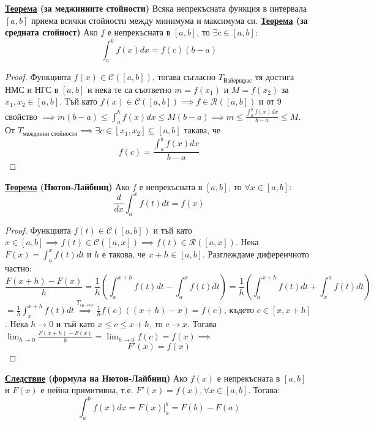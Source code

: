 \documentclass{article}
\begin{document}
\textbf{\underline{Теорема} (за меджинните стойности)} \newline
Всяка непрекъсната функция в интервала $[a, b]$ приема всички стойности между минимума и максимума си. \newline\newline
\textbf{\underline{Теорема} (за средната стойност)} \newline
Ако $f$ е непрекъсната в $[a, b]$, то $\exists c \in [a, b] : $ \[ \int_{a}^{b} f(x)dx = f(c)(b - a)\]
\begin{proof}
Функцията $f(x) \in \mathcal{C}([a, b])$, тогава съгласно $T_{\text{Вайерщрас}}$ тя достига НМС и НГС в $[a, b]$ и нека те са съответно $m = f(x_1)$ и $M = 
f(x_2)$ за $x_1, x_2 \in [a, b]$. Тъй като $f(x)\in \mathcal{C}([a, b]) \implies f \in \mathcal{R}([a, b])$ и от $9$ свойство $\implies m(b - a) \leq
\int_{a}^{b} f(x)dx \leq M(b - a) \implies m \leq \frac{\int_{a}^{b} f(x)dx}{b - a} \leq M$. \newline От $T_{\text{междинни стойности}} \implies \exists c
\in [x_1, x_2] \subseteq [a, b]$ такава, че $$f(c) = \frac{\int_{a}^{b} f(x)dx}{b - a}$$
\end{proof}
\textbf{\underline{Теорема} (Нютон-Лайбниц)} \newline
Ако $f$ е непрекъсната в $[a, b]$, то $\forall x \in [a, b] :$ \[ \frac{d}{dx} \int_{a}^{x} f(t)dt = f(x)\]
\begin{proof}
Функцията $f(t) \in \mathcal{C}([a, b])$ и тъй като $x \in [a, b] \implies f(t) \in \mathcal{C}([a, x]) \implies f(t) \in \mathcal{R}([a, x])$.
Нека $F(x) = \int_{a}^{x} f(t)dt$ и $h$ е такова, че $x + h \in [a, b]$. Разглеждаме диференчното частно: $$\frac{F(x + h) - F(x)}{h} =
\frac{1}{h}(\int_{a}^{x + h} f(t)dt - \int_{a}^{x} f(t)dt) = \frac{1}{h}(\int_{a}^{x + h} f(t)dt + \int_{x}^{a} f(t)dt)$$ $= \frac{1}{h}\int_{x}^{x + h} f(t)dt
\overset{T_{\text{ср. ст-т}}}{\implies} \frac{1}{h} f(c)((x + h) - x) = f(c)$, където $c \in [x, x + h]$. \newline Нека $h \rightarrow 0$ и тъй като
$x \leq c \leq x + h$, то $c \rightarrow x$. Тогава $\lim_{h \rightarrow 0}\frac{F(x + h) - F(x)}{h} = \lim_{h \rightarrow 0} f(c) = f(x) \implies$ $$F'(x) = f(x)$$
\end{proof}
\textbf{\underline{Следствие} (формула на Нютон-Лайбниц)} \newline
Ако $f(x)$ е непрекъсната в $[a, b]$ и $F(x)$ е нейна примитивна, т.е. $F'(x) = f(x), \forall x \in [a, b]$. Тогава:
$$\int_{a}^{b}f(x)dx = F(x)|_a^b = F(b) - F(a)$$
\section*{\centering \color{lightGreen}{Аналитична геометрия}}
\end{document}
